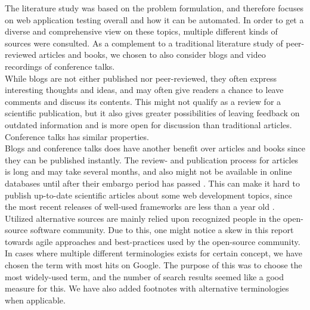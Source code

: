 
The literature study was based on the problem formulation, and therefore
focuses on web application testing overall and how it can be automated.
In order to get a diverse and comprehensive view on these topics,
multiple different kinds of sources were consulted. As a
complement to a traditional literature study of peer-reviewed articles
and books, we chosen to also consider blogs and video recordings of
conference talks.\\

While blogs are not either published nor peer-reviewed, they often
express interesting thoughts and ideas, and may often give readers a
chance to leave comments and discuss its contents. This might not
qualify as a review for a scientific publication, but it also gives
greater possibilities of leaving feedback on outdated information and
is more open for discussion than traditional articles. Conference
talks has similar properties.\\

Blogs and conference talks does have another benefit over articles and
books since they can be published instantly. The review- and publication
process for articles is long and may take several months, and also might
not be available in online databases until after their embargo period
has passed \cite{wiki:embargo, pdf:publishing}. This can make it hard to
publish up-to-date scientific articles about some web development
topics, since the most recent releases of well-used frameworks are less
than a year old \cite{wiki:rails_versions, wiki:django_versions,
web:knockout_versions}.\\

Utilized alternative sources are mainly relied upon recognized people in
the open-source software community. Due to this, one might notice a skew
in this report towards agile approaches and best-practices used by the
open-source community.\\

In cases where multiple different terminologies exists for certain
concept, we have chosen the term with most hits on Google. The purpose
of this was to choose the most widely-used term, and the number of
search results seemed like a good measure for this. We have also added
footnotes with alternative terminologies when applicable.\\
